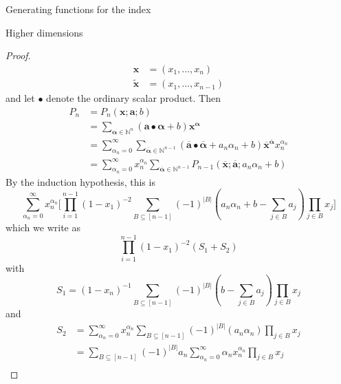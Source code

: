\documentclass[reqno,a4paper,10pt]{amsart}
\theoremstyle{definition}
\theoremstyle{remark}
\theoremstyle{plain}
\newcommand{\vek}[1]{\boldsymbol{#1}}
\newcommand{\tdeg}[1]{\lvert #1 \rvert}
\newcommand{\Nat}{{\mathbb{N}}}
\begin{document}
\begin{section}{Generating functions for the index}
\begin{subsection}{Higher dimensions}
\begin{proof}
\begin{displaymath}
\begin{split}
        \vek{x} & = (x_1,\dots,x_n) \\
        \widetilde{\vek{x}} &= (x_1,\dots,x_{n-1})
      \end{split}
    \end{displaymath}
    and let \(\bullet\) denote the ordinary scalar product.
    Then
    \begin{displaymath}
      \begin{split}
        P_n &= P_n(\vek{x};\vek{a};b) \\
        &= \sum_{\vek{\alpha} \in \Nat^n}
        (\vek{a} \bullet \vek{\alpha} +b) \vek{x}^{\vek{\alpha}} \\
        &= \sum_{\alpha_n=0}^\infty \sum_{\overline{\vek{\alpha}} \in
          \Nat^{n-1}}
        (\overline{\vek{a}} \bullet \overline{\vek{\alpha}} + a_n\alpha_n
        +b) \overline{\vek{x}}^{\overline{\vek{\alpha}}} x_n^{\alpha_n} \\
        &=\sum_{\alpha_n=0}^\infty x_n^{\alpha_n}
        \sum_{\overline{\vek{\alpha}} \in \Nat^{n-1}}
        P_{n-1}(\overline{\vek{x}}; \overline{\vek{a}};a_n \alpha_n +b)
      \end{split}
    \end{displaymath}  
    By the induction hypothesis, this is 
    \begin{displaymath}
      \sum_{\alpha_n=0}^\infty x_n^{\alpha_n} 
      \Biggl[
      \prod_{i=1}^{n-1}(1-x_1)^{-2} \sum_{B \subseteq 
        [n-1]} (-1)^{\tdeg{B}} (a_n \alpha_n +b - \sum_{j \in B}
      a_j) \prod_{j \in B} x_j 
      \Biggr] 
    \end{displaymath}
    which we write as 
    \begin{displaymath}
       \prod_{i=1}^{n-1}(1-x_1)^{-2} (S_1+S_2) 
     \end{displaymath}
     with 
     \begin{displaymath}
       S_1 =         (1-x_n)^{-1}
       \sum_{B \subseteq 
         [n-1]} (-1)^{\tdeg{B}} (b - \sum_{j \in B}
       a_j) \prod_{j \in B} x_j 
     \end{displaymath}
     and
     \begin{displaymath}
       \begin{split}
       S_2&= \sum_{\alpha_n=0}^\infty x_n^{\alpha_n}
        \sum_{B \subseteq [n-1]} (-1)^{\tdeg{B}} (a_n \alpha_n )
        \prod_{j \in B} x_j  \\
        &= \sum_{B \subseteq [n-1]} (-1)^{\tdeg{B}}   a_n
        \sum_{\alpha_n=0}^\infty \alpha_nx_n^{\alpha_n} \prod_{j
          \in B} x_j \\

\end{split}
\end{displaymath}
\end{proof}
\end{subsection}
\end{section}
\end{document}
